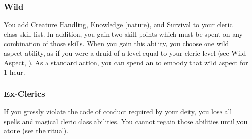         \subsubsection{Wild}
             You add Creature Handling, Knowledge (nature), and Survival to your cleric class skill list.
            In addition, you gain two skill points which must be spent on any combination of those skills.
             When you gain this ability, you choose one wild aspect ability, as if you were a druid of a level equal to your cleric level (see Wild Aspect, ).
            As a standard action, you can spend an  to embody that wild aspect for 1 hour.

        \subsubsection{Ex-Clerics}
            If you grossly violate the code of conduct required by your deity, you lose all spells and magical cleric class abilities.
            You cannot regain those abilities until you atone (see the  ritual).

